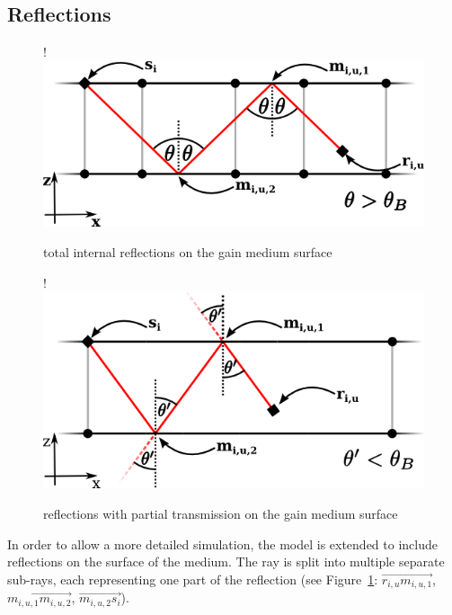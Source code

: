 \subsection{Reflections} \label{subsec:reflections}
\begin{figure}[H]
  \centerline{
     {!} {\includegraphics{./graphics/reflections_2.png}}
  }
  \caption{total internal reflections on the gain medium surface}
  \label{graphic:reflections_2D}
\end{figure}
\begin{figure}[H]
  \centerline{
     {!} {\includegraphics{./graphics/transmission1.png}}
  }
  \caption{reflections with partial transmission on the gain medium surface}
  \label{graphic:transmission_2D}
\end{figure}
In order to allow a more detailed simulation, the model is extended to include
reflections on the surface of the medium. The ray is split into multiple
separate sub-rays, each representing one part of the reflection (see
Figure~\ref{graphic:reflections_2D}: $\overrightarrow{r_{i,u}m_{i,u,1}}$,
$\overrightarrow{m_{i,u,1}m_{i,u,2}}$, $\overrightarrow{m_{i,u,2}s_i}$).

